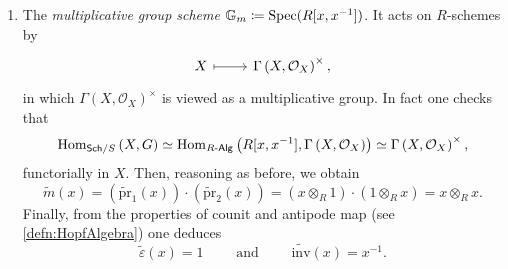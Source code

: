 \begin{ex}
\begin{enumerate}
		\item The \emph{multiplicative group scheme} \label{ex:MultiplicativeGroupScheme}
			$\mathbb{G}_m \coloneqq \operatorname{Spec}(R[x,x^{-1}])$.
			It acts on $R$-schemes by
			\begin{equation*}
			\begin{tikzcd}[row sep = 0ex
				,/tikz/column 1/.append style={anchor=base east}
				,/tikz/column 2/.append style={anchor=base west}]
				X \arrow[r, "", mapsto] & 
				\Gamma \left( X , \mathcal{O}_{ X } \right)^{\times}
			,\end{tikzcd}
			\end{equation*} 
			in which $\Gamma \left( X , \mathcal{O}_{ X } \right)^{\times}$ is viewed
			as a multiplicative group.
			In fact one checks that
			\begin{equation*}
			\operatorname{Hom}_{\mathsf{Sch}/S} \left( X, G \right) \simeq
			\operatorname{Hom}_{R \text{-}\mathsf{Alg}} 
			\left( R[x, x^{-1}], \Gamma \left( X , \mathcal{O}_{ X } \right) \right) \simeq
			\Gamma \left( X , \mathcal{O}_{ X } \right)^{\times}
			,\end{equation*} 
			functorially in $X$.
			Then, reasoning as before, we obtain
			\begin{equation*}
				\widetilde{m}(x) =
				\left( \widetilde{\mathrm{pr}}_1(x) \right) \cdot
				\left( \widetilde{\mathrm{pr}}_2(x) \right) =
				(x \otimes_R 1) \cdot (1 \otimes_R x) = 
				x \otimes_R x
			.\end{equation*} 
			Finally, from the properties  of counit and antipode map
			(see \cref{defn:HopfAlgebra}) one deduces
			\begin{equation*}
				\widetilde{\varepsilon}(x) = 1
				\qquad \text{ and } \qquad
				\widetilde{\mathrm{inv}}(x) = x^{-1}
			.\end{equation*} 



\end{enumerate}
\end{ex}
